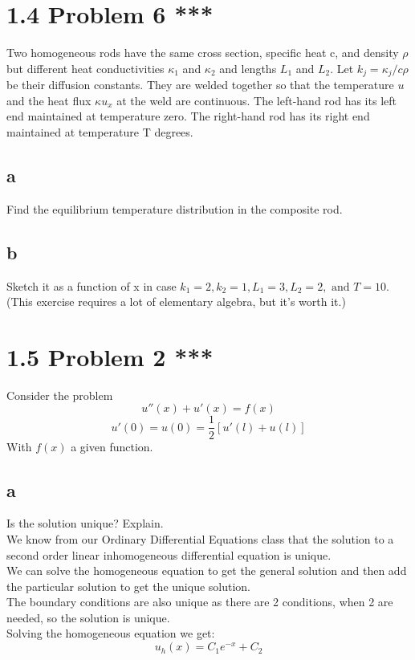 \documentclass{article}
\begin{document}
\section*{1.4 Problem 6 ***}
Two homogeneous rods have the same cross section, specific heat c, and
density $\rho$ but different heat conductivities $\kappa_1$ and $\kappa_2$ and lengths $L_1$ and $L_2$. Let $k_j = \kappa_j/c\rho$ be their diffusion constants. They are welded together
so that the temperature $u$ and the heat flux $\kappa u_x$ at the weld are continuous.
The left-hand rod has its left end maintained at temperature zero. The
right-hand rod has its right end maintained at temperature T degrees.\\
\subsection*{a} Find the equilibrium temperature distribution in the composite rod.

\subsection*{b} Sketch it as a function of x in case $k_1 = 2, k_2 = 1, L_1 = 3, L_2 = 2, \text{ and } T = 10$. (This exercise requires a lot of elementary algebra, but
it's worth it.)


\section*{1.5 Problem 2 ***}
Consider the problem 
$$ u''(x) + u'(x) = f(x)$$
$$ u'(0) = u(0) = \frac{1}{2}[u'(l) + u(l)]$$
With $f(x)$ a given function.\\
\subsection*{a} Is the solution unique? Explain.\\
We know from our Ordinary Differential Equations class that the solution to a second order linear inhomogeneous differential equation is unique.\\
We can solve the homogeneous equation to get the general solution and then add the particular solution to get the unique solution.\\
The boundary conditions are also unique as there are 2 conditions, when 2 are needed, so the solution is unique.\\
Solving the homogeneous equation we get:
$$ u_h(x) = C_1e^{-x} + C_2$$
\end{document}
